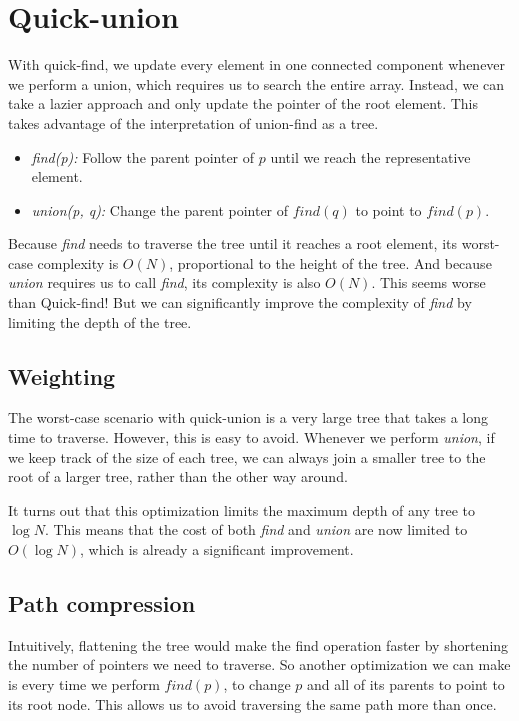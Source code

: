 \documentclass{article}
\begin{document}
\section{Quick-union}
With quick-find, we update every element in one connected component whenever we perform a union, which requires us to search the entire array. Instead, we can take a lazier approach and only update the pointer of the root element. This takes advantage of the interpretation of union-find as a tree.

\begin{itemize}
    \item \textit{find(p):} Follow the parent pointer of $p$ until we reach the representative element.
    \item \textit{union(p, q):} Change the parent pointer of $find(q)$ to point to $find(p)$.
\end{itemize}

Because \textit{find} needs to traverse the tree until it reaches a root element, its worst-case complexity is $O(N)$, proportional to the height of the tree. And because \textit{union} requires us to call \textit{find}, its complexity is also $O(N)$. This seems worse than Quick-find! But we can significantly improve the complexity of \textit{find} by limiting the depth of the tree.


\subsection{Weighting}
The worst-case scenario with quick-union is a very large tree that takes a long time to traverse. However, this is easy to avoid. Whenever we perform \textit{union}, if we keep track of the size of each tree, we can always join a smaller tree to the root of a larger tree, rather than the other way around.

It turns out that this optimization limits the maximum depth of any tree to $\log N$. This means that the cost of both \textit{find} and \textit{union} are now limited to $O(\log N)$, which is already a significant improvement.

\subsection{Path compression}
Intuitively, flattening the tree would make the find operation faster by shortening the number of pointers we need to traverse. So another optimization we can make is every time we perform $find(p)$, to change $p$ and all of its parents to point to its root node. This allows us to avoid traversing the same path more than once.
\end{document}
